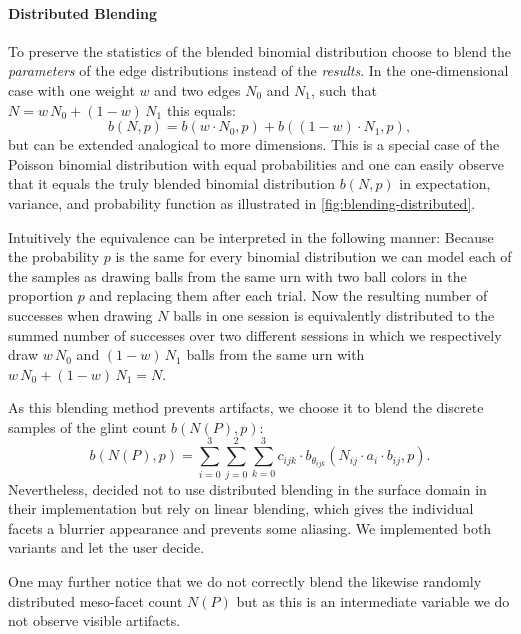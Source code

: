 \paragraph{Distributed Blending}
\label{sec:blending-distributed}
%
To preserve the statistics of the blended binomial distribution \textcite{deliot2023} choose to blend the \emph{parameters} of the edge distributions instead of the \emph{results}.
%
In the one-dimensional case with one weight $w$ and two edges $N_0$ and $N_1$, such that $N=w \, N_0 + (1-w) \, N_1$ this equals:
%
\begin{equation}
    b(N, p) = b(w \cdot N_0, p) + b((1-w) \cdot N_1, p),
\end{equation}
%
but can be extended analogical to more dimensions.
%
This is a special case of the Poisson binomial distribution with equal probabilities and one can easily observe that it equals the truly blended binomial distribution $b(N, p)$ in expectation, variance, and probability function as illustrated in \cref{fig:blending-distributed}.

Intuitively the equivalence can be interpreted in the following manner:
%
Because the probability $p$ is the same for every binomial distribution we can model each of the samples as drawing balls from the same urn with two ball colors in the proportion $p$ and replacing them after each trial.
%
Now the resulting number of successes when drawing $N$ balls in one session is equivalently distributed to the summed number of successes over two different sessions in which we respectively draw $w \, N_0$ and $(1-w) \, N_1$ balls from the same urn with $w \, N_0 + (1-w) \, N_1=N$.


As this blending method prevents artifacts, we choose it to blend the discrete samples of the glint count $b(N(P),p)$:
%
\begin{equation}
    b(N(P),p) = \sum_{i=0}^{3} \sum_{j=0}^{2} \sum_{k=0}^{3} c_{ijk} \cdot b_{\theta_{ijk}}\left(N_{ij} \cdot a_{i} \cdot b_{ij}, p\right).
\end{equation}
%
Nevertheless, \textcite{deliot2023} decided not to use distributed blending in the surface domain in their implementation but rely on linear blending, which gives the individual facets a blurrier appearance and prevents some aliasing.
%
We implemented both variants and let the user decide.

One may further notice that we do not correctly blend the likewise randomly distributed meso-facet count $N(P)$ but as this is an intermediate variable we do not observe visible artifacts.
